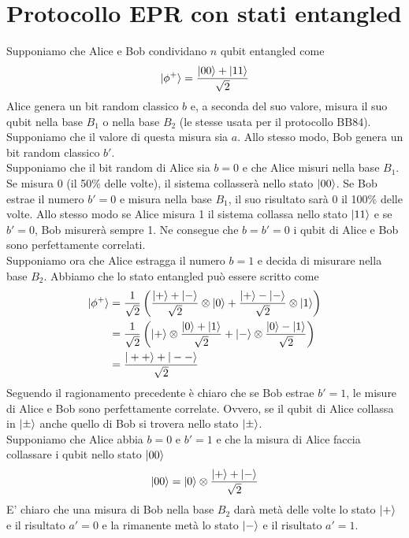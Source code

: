\documentclass[12pt, a4paper]{report}
\begin{document}
\section{Protocollo EPR con stati entangled}
Supponiamo che Alice  e Bob condividano $n$ qubit entangled come
\begin{equation*}
    | \phi^{+} \rangle = \frac{| 00 \rangle+| 11 \rangle}{\sqrt{2}}
\end{equation*}
Alice genera un bit random classico $b$ e, a seconda del suo valore, misura il suo qubit nella base $B_{1}$ o nella base $B_{2}$ (le stesse usata per il protocollo BB84). Supponiamo che il valore di questa misura sia $a$. Allo stesso modo, Bob genera un bit random classico $b'$.\\
Supponiamo che il bit random di Alice sia $b=0$ e che Alice misuri nella base $B_{1}$. Se misura 0 (il 50\% delle volte), il sistema collasserà nello stato $| 00 \rangle$. Se Bob estrae il numero $b'=0$ e misura nella base $B_{1}$, il suo risultato sarà 0 il 100\% delle volte. Allo stesso modo se Alice misura 1 il sistema  collassa nello stato $| 11 \rangle$ e se $b'=0$, Bob misurerà sempre 1. Ne consegue che $b=b'=0$ i qubit di Alice e Bob sono perfettamente correlati.\\
Supponiamo ora che Alice estragga il numero $b=1$ e decida di misurare nella base $B_{2}$. Abbiamo che lo stato entangled può essere scritto come
\begin{equation*}
    \begin{split}
        | \phi^{+} \rangle &= \frac{1}{\sqrt{2}}\left(\frac{| + \rangle+| - \rangle}{\sqrt{2}}\otimes| 0 \rangle+\frac{| + \rangle-| - \rangle}{\sqrt{2}}\otimes| 1 \rangle\right) \\
        &= \frac{1}{\sqrt{2}}\left(| + \rangle\otimes\frac{| 0 \rangle+| 1 \rangle}{\sqrt{2}}+| - \rangle\otimes\frac{| 0 \rangle-| 1 \rangle}{\sqrt{2}}\right) \\
        &= \frac{| ++ \rangle+| -- \rangle}{\sqrt{2}}   
    \end{split}
\end{equation*}
Seguendo il ragionamento precedente è chiaro che se Bob estrae $b'=1$, le misure di Alice e Bob sono perfettamente correlate. Ovvero, se il qubit di Alice collassa in $| \pm \rangle$ anche quello di Bob si trovera nello stato $| \pm \rangle$.\\
Supponiamo che Alice abbia $b=0$ e $b'=1$ e che la misura di Alice faccia collassare i qubit nello stato $| 00 \rangle$
\begin{equation*}
    | 00 \rangle=| 0 \rangle\otimes\frac{| + \rangle+| - \rangle}{\sqrt{2}}
\end{equation*}
E' chiaro che una misura di Bob nella base $B_{2}$ darà metà delle volte lo stato $| + \rangle$ e il risultato $a'=0$ e la rimanente metà lo stato $| - \rangle$ e il risultato $a'=1$.
\end{document}
